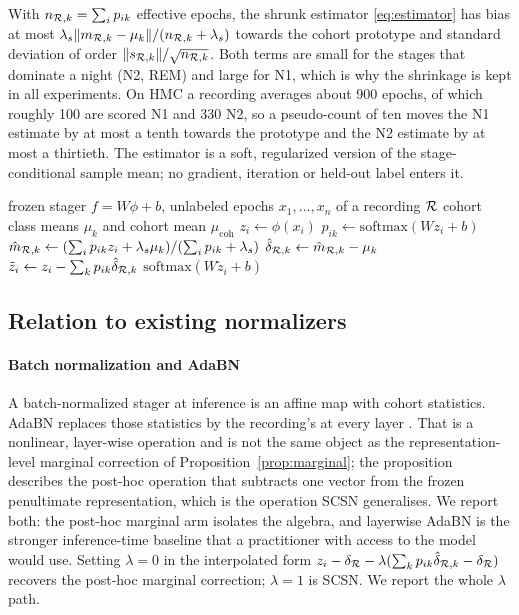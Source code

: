 \begin{remark}
With $n_{\mathcal{R},k}=\sum_i p_{ik}$ effective epochs, the shrunk estimator
\eqref{eq:estimator} has bias at most
$\lambda_s\|m_{\mathcal{R},k}-\mu_k\|/(n_{\mathcal{R},k}+\lambda_s)$ towards the cohort
prototype and standard deviation of order $\|s_{\mathcal{R},k}\|/\sqrt{n_{\mathcal{R},k}}$.
Both terms are small for the stages that dominate a night (N2, REM) and large
for N1, which is why the shrinkage is kept in all experiments. On HMC a
recording averages about 900 epochs, of which roughly 100 are scored N1 and
330 N2, so a pseudo-count of ten moves the N1 estimate by at most a tenth
towards the prototype and the N2 estimate by at most a thirtieth. The estimator
is a soft, regularized version of the stage-conditional sample mean; no
gradient, iteration or held-out label enters it.
\end{remark}

\begin{algorithm}[t]
\caption{Stage-conditional shift normalization (one recording)}
\label{alg:scsn}
\begin{algorithmic}[1]
\Require frozen stager $f=W\phi+b$, unlabeled epochs $x_1,\dots,x_n$ of a recording $\mathcal{R}$
\Require cohort class means $\mu_k$ and cohort mean $\mu_{\mathrm{coh}}$
\State $z_i\gets\phi(x_i)$ 
\State $p_{ik}\gets\mathrm{softmax}(Wz_i+b)$
  \State $\hat m_{\mathcal{R},k}\gets(\sum_i p_{ik}z_i+\lambda_s\mu_k)/(\sum_i p_{ik}+\lambda_s)$
  \State $\hat\delta_{\mathcal{R},k}\gets\hat m_{\mathcal{R},k}-\mu_k$
\EndFor
\State $\tilde z_i\gets z_i-\sum_k p_{ik}\hat\delta_{\mathcal{R},k}$ 
\State \Return $\mathrm{softmax}(W\tilde z_i+b)$
\end{algorithmic}
\end{algorithm}

\subsection{Relation to existing normalizers}

\paragraph{Batch normalization and AdaBN}
A batch-normalized stager at inference is an affine map with cohort
statistics. AdaBN replaces those statistics by the recording's at every layer
\citep{li2018adabn}. That is a nonlinear, layer-wise operation and is not the
same object as the representation-level marginal correction of
Proposition~\ref{prop:marginal}; the proposition describes the post-hoc
operation that subtracts one vector from the frozen penultimate
representation, which is the operation SCSN generalises. We report both: the
post-hoc marginal arm isolates the algebra, and layerwise AdaBN is the
stronger inference-time baseline that a practitioner with access to the model
would use. Setting $\lambda=0$ in the interpolated form
$z_i-\delta_{\mathcal{R}}-\lambda(\sum_k p_{ik}\hat\delta_{\mathcal{R},k}-\delta_{\mathcal{R}})$
recovers the post-hoc marginal correction; $\lambda=1$ is SCSN. We report the
whole $\lambda$ path.

